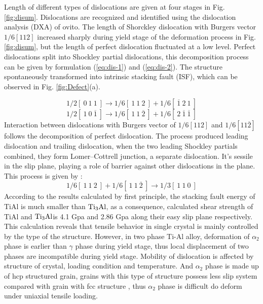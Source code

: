 \documentclass[materials,article,submit,moreauthors,pdftex,10pt,a4paper]{Definitions/mdpi}
\begin{document}
Length of different types of dislocations are given at four stages in Fig. \ref{fig:disum}. Dislocations are recognized and identified using the dislocation analysis (DXA) of ovito. The length of Shorckley dislocation with Burgers vector $1/6[1 1 2]$ increased sharply during yield stage of the deformation process in Fig. \ref{fig:disum}, but the length of perfect dislocation fluctuated at a low level. Perfect  dislocations split into Shockley partial dislocations, this decomposition process  can be given by formulation (\ref{eq:dis-1}) and (\ref{eq:dis-2}). The structure spontaneously transformed into intrinsic stacking fault (ISF), which can be observed in Fig. \ref{fig:Defect}(a). 


\begin{equation}\label{eq:dis-1}
1/2 [\ 0\ 1\ 1\ ] \to 1/6[\ 1\ 1\ 2\ ]+1/6[\ \overline{1}\ 2\ 1\ ]
\end{equation}
\begin{equation}\label{eq:dis-2}
1/2 [\ 1\ 0\ \overline{1}\ ] \to 1/6 [\ 1\ 1\ \overline{2}\ ] + 1/6[\ 2\ \overline{1}\ \overline{1}\ ]
\end{equation}
Interaction between dislocations with Burgers vector of $1/6 [112] $ and $ 1/6 [11\overline{2}]$ follows the decomposition of perfect dislocation. The process produced leading dislocation and trailing dislocation, when the two leading Shockley partials combined, they form Lomer–Cottrell junction, a separate dislocation. It's sessile in the slip plane, playing a role of barrier against other dislocations in the plane. This process is given by :
\begin{equation}\label{eq:dis-3}
1/6 [\ 1\ 1\ 2\ ] + 1/6 [\ 1\ 1\  \overline{2}\ ] \to 1/3 [\ 1\ 1\ 0\ ]
\end{equation}
According to the  results calculated by first principle, the stacking fault energy of TiAl is much smaller than $\rm{Ti_3Al}$, as a consequence, calculated shear strength of TiAl and $\rm{Ti_3Al}$is 4.1 Gpa and 2.86 Gpa along their easy slip plane respectively\cite{Liu2007}. This calculation reveals that tensile behavior in single crystal is mainly controlled by the type of the structure. However, in two phase Ti-Al alloy, deformation of $\alpha_2$ phase is earlier than $\gamma$ phase during yield stage, thus local displacement of two phases are incompatible during yield stage.  Mobility of dislocation is affected by structure of crystal, loading condition and temperature. And $\alpha_2$ phase is made up of hcp  structured grain, grains with this type of structure possess less slip system compared with grain with fcc structure \cite{Zhu2012}, thus $\alpha_2$ phase is difficult do deform under uniaxial tensile loading. 
\end{document}

